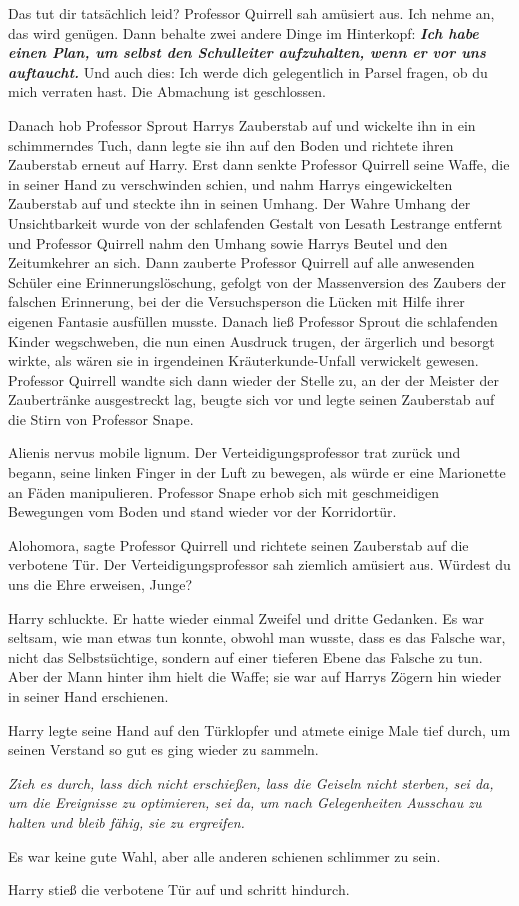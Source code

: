 \glqq{}Das tut dir tatsächlich leid?\grqq{} Professor Quirrell sah amüsiert aus. \glqq{}
Ich nehme an, das wird genügen. Dann behalte zwei andere Dinge im Hinterkopf:
\textbf{\emph{Ich habe einen Plan, um selbst den Schulleiter aufzuhalten, wenn
er vor uns auftaucht.} }Und auch dies: Ich werde dich gelegentlich in Parsel
fragen, ob du mich verraten hast. Die Abmachung ist geschlossen.\grqq{}

Danach hob Professor Sprout Harrys Zauberstab auf und wickelte ihn in ein
schimmerndes Tuch, dann legte sie ihn auf den Boden und richtete ihren
Zauberstab erneut auf Harry. Erst dann senkte Professor Quirrell seine Waffe,
die in seiner Hand zu verschwinden schien, und nahm Harrys eingewickelten
Zauberstab auf und steckte ihn in seinen Umhang. Der Wahre Umhang der
Unsichtbarkeit wurde von der schlafenden Gestalt von Lesath Lestrange entfernt
und Professor Quirrell nahm den Umhang sowie Harrys Beutel und den Zeitumkehrer
an sich. Dann zauberte Professor Quirrell auf alle anwesenden Schüler eine
Erinnerungslöschung, gefolgt von der Massenversion des Zaubers der falschen
Erinnerung, bei der die Versuchsperson die Lücken mit Hilfe ihrer eigenen
Fantasie ausfüllen musste. Danach ließ Professor Sprout die schlafenden Kinder
wegschweben, die nun einen Ausdruck trugen, der ärgerlich und besorgt wirkte,
als wären sie in irgendeinen Kräuterkunde-Unfall verwickelt gewesen. Professor
Quirrell wandte sich dann wieder der Stelle zu, an der der Meister der
Zaubertränke ausgestreckt lag, beugte sich vor und legte seinen Zauberstab auf
die Stirn von Professor Snape.

\glqq{}Alienis nervus mobile lignum.\grqq{} Der Verteidigungsprofessor trat zurück und
begann, seine linken Finger in der Luft zu bewegen, als würde er eine Marionette
an Fäden manipulieren. Professor Snape erhob sich mit geschmeidigen Bewegungen
vom Boden und stand wieder vor der Korridortür.

\glqq{}Alohomora\grqq{}, sagte Professor Quirrell und richtete seinen Zauberstab
auf die verbotene Tür. Der Verteidigungsprofessor sah ziemlich amüsiert aus.
\glqq{}Würdest du uns die Ehre erweisen, Junge?\grqq{}

Harry schluckte. Er hatte wieder einmal Zweifel und dritte Gedanken. Es war
seltsam, wie man etwas tun konnte, obwohl man wusste, dass es das Falsche war,
nicht das Selbstsüchtige, sondern auf einer tieferen Ebene das Falsche zu tun.
Aber der Mann hinter ihm hielt die Waffe; sie war auf Harrys Zögern hin wieder
in seiner Hand erschienen.

Harry legte seine Hand auf den Türklopfer und atmete einige Male tief durch, um
seinen Verstand so gut es ging wieder zu sammeln.

\emph{Zieh es durch, lass dich nicht erschießen, lass die Geiseln nicht sterben,
sei da, um die Ereignisse zu optimieren, sei da, um nach Gelegenheiten Ausschau
zu halten und bleib fähig, sie zu ergreifen.}

Es war keine gute Wahl, aber alle anderen schienen schlimmer zu sein.

Harry stieß die verbotene Tür auf und schritt hindurch.

